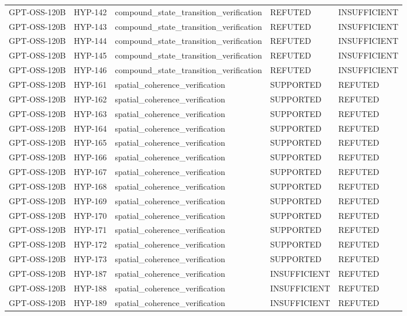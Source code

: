 \begin{tabular}{lllll}
GPT-OSS-120B & HYP-142 & compound_state_transition_verification & REFUTED & INSUFFICIENT \\
GPT-OSS-120B & HYP-143 & compound_state_transition_verification & REFUTED & INSUFFICIENT \\
GPT-OSS-120B & HYP-144 & compound_state_transition_verification & REFUTED & INSUFFICIENT \\
GPT-OSS-120B & HYP-145 & compound_state_transition_verification & REFUTED & INSUFFICIENT \\
GPT-OSS-120B & HYP-146 & compound_state_transition_verification & REFUTED & INSUFFICIENT \\
GPT-OSS-120B & HYP-161 & spatial_coherence_verification & SUPPORTED & REFUTED \\
GPT-OSS-120B & HYP-162 & spatial_coherence_verification & SUPPORTED & REFUTED \\
GPT-OSS-120B & HYP-163 & spatial_coherence_verification & SUPPORTED & REFUTED \\
GPT-OSS-120B & HYP-164 & spatial_coherence_verification & SUPPORTED & REFUTED \\
GPT-OSS-120B & HYP-165 & spatial_coherence_verification & SUPPORTED & REFUTED \\
GPT-OSS-120B & HYP-166 & spatial_coherence_verification & SUPPORTED & REFUTED \\
GPT-OSS-120B & HYP-167 & spatial_coherence_verification & SUPPORTED & REFUTED \\
GPT-OSS-120B & HYP-168 & spatial_coherence_verification & SUPPORTED & REFUTED \\
GPT-OSS-120B & HYP-169 & spatial_coherence_verification & SUPPORTED & REFUTED \\
GPT-OSS-120B & HYP-170 & spatial_coherence_verification & SUPPORTED & REFUTED \\
GPT-OSS-120B & HYP-171 & spatial_coherence_verification & SUPPORTED & REFUTED \\
GPT-OSS-120B & HYP-172 & spatial_coherence_verification & SUPPORTED & REFUTED \\
GPT-OSS-120B & HYP-173 & spatial_coherence_verification & SUPPORTED & REFUTED \\
GPT-OSS-120B & HYP-187 & spatial_coherence_verification & INSUFFICIENT & REFUTED \\
GPT-OSS-120B & HYP-188 & spatial_coherence_verification & INSUFFICIENT & REFUTED \\
GPT-OSS-120B & HYP-189 & spatial_coherence_verification & INSUFFICIENT & REFUTED \\

\end{tabular}
